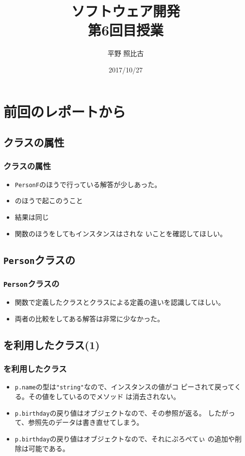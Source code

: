 %
%

\title{ソフトウェア開発\\第6回目授業}
\author{平野 照比古}
\institute{}
\date{2017/10/27}

\frame{\maketitle}
\section{前回のレポートから}
\subsection{クラスの属性}
\begin{frame}
 \frametitle{クラスの属性}
 \begin{itemize}
	\item \texttt{PersonF}のほうで行っている解答が少しあった。
	\item {}のほうで起このうこと
	\item 結果は同じ
	\item 関数のほうをしてもインスタンスはされな
				いことを確認してほしい。
 \end{itemize}
\end{frame}
\subsection{\texttt{Person}クラスの}
\begin{frame}
 \frametitle{\texttt{Person}クラスの}
 \begin{itemize}
	\item 関数で定義したクラスとクラスによる定義の違いを認識してほしい。
	\item 両者の比較をしてある解答は非常に少なかった。
 \end{itemize}
\end{frame}
\subsection{を利用したクラス(1)}
\begin{frame}
 \frametitle{を利用したクラス}
 \begin{itemize}
	\item \texttt{p.name}の型は\Verb+"string"+なので、インスタンスの値がコ
				ピーされて戻ってくる。その値をしているのでメソッド
				は消去されない。
	\item \texttt{p.birthday}の戻り値はオブジェクトなので、その参照が返る。
				したがって、参照先のデータは書き直せてしまう。
	\item \texttt{p.birthday}の戻り値はオブジェクトなので、それにぷろぺてぃ
				の追加や削除は可能である。
 \end{itemize}
\end{frame}

